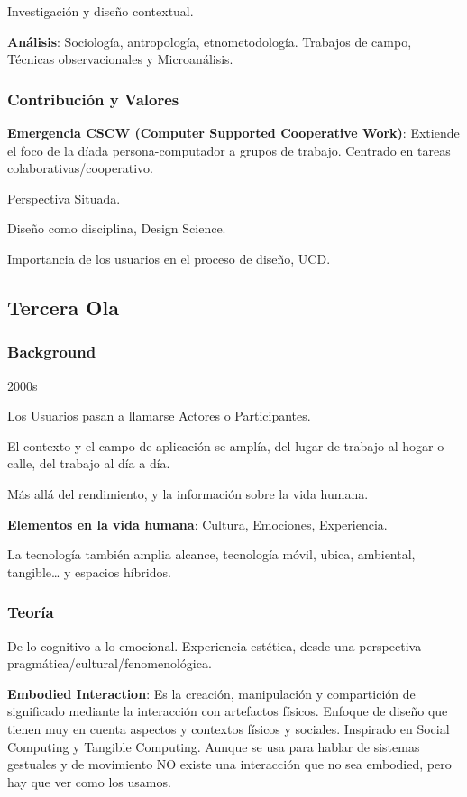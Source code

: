 \documentclass[12pt, twoside, openright]{report} %
\begin{document}
Investigación y diseño contextual.

\textbf{Análisis}: Sociología, antropología, etnometodología. Trabajos
de campo, Técnicas observacionales y Microanálisis.

\subsubsection{Contribución y Valores}

\textbf{Emergencia CSCW (Computer Supported Cooperative Work)}: Extiende
el foco de la díada persona-computador a grupos de trabajo. Centrado en
tareas colaborativas/cooperativo.

Perspectiva Situada.

Diseño como disciplina, Design Science.

Importancia de los usuarios en el proceso de diseño, UCD.

\subsection{Tercera Ola}


\subsubsection{Background}

2000s

Los Usuarios pasan a llamarse Actores o Participantes.

El contexto y el campo de aplicación se amplía, del lugar de trabajo al
hogar o calle, del trabajo al día a día.

Más allá del rendimiento, y la información sobre la vida humana.

\textbf{Elementos en la vida humana}: Cultura, Emociones, Experiencia.

La tecnología también amplia alcance, tecnología móvil, ubica,
ambiental, tangible\ldots{} y espacios híbridos.

\subsubsection{Teoría}

De lo cognitivo a lo emocional. Experiencia estética, desde una
perspectiva pragmática/cultural/fenomenológica.

\textbf{Embodied Interaction}: Es la creación, manipulación y
compartición de significado mediante la interacción con artefactos
físicos. Enfoque de diseño que tienen muy en cuenta aspectos y contextos
físicos y sociales. Inspirado en Social Computing y Tangible Computing.
Aunque se usa para hablar de sistemas gestuales y de movimiento NO
existe una interacción que no sea embodied, pero hay que ver como los
usamos.
\end{document}
